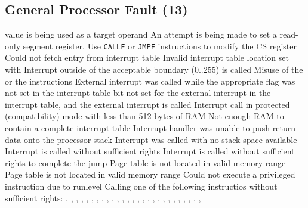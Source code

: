 \subsection{General Processor Fault (13)}
           { value is being used as a target operand}
           {An attempt is being made to set a read-only segment register. Use \texttt{CALLF} or \texttt{JMPF} instructions to modify the CS register}
           {}
           {Could not fetch entry from interrupt table}
           {Invalid interrupt table location set with }
           {}
           {Interrupt outside of the acceptable boundary (0..255) is called}
           {Misuse of the  or the  instructions}
           {}
           {External interrupt was called while the appropriate flag was not set in the interrupt table}
           { bit not set for the external interrupt in the interrupt table, and the external interrupt is called}
           {}
           {Interrupt call in protected (compatibility) mode with less than 512 bytes of RAM}
           {Not enough RAM to contain a complete interrupt table}
           {} 
           {Interrupt handler was unable to push return data onto the processor stack}
           {Interrupt was called with no stack space available}
           {}
           {Interrupt is called without sufficient rights}
           {Interrupt is called without sufficient rights to complete the jump}
           {}
           {Page table is not located in valid memory range}
           {Page table is not located in valid memory range}
           {}
           {Could not execute a privileged instruction due to runlevel}
           {Calling one of the following instructios without sufficient rights: , , , , , , , , , , , , , , , , , , , , , , , , , , , 
}
           {}


